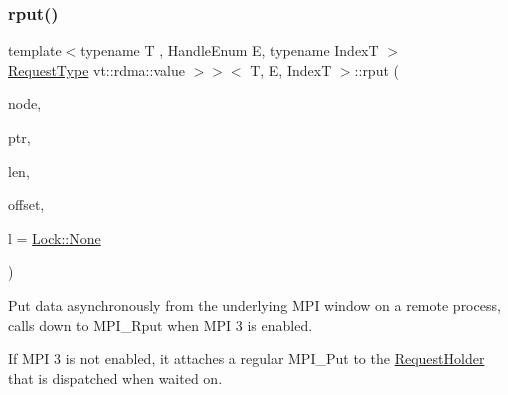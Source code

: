 \subsubsection{\texorpdfstring{rput()}{rput()}}
{\footnotesize\ttfamily template$<$typename T , Handle\+Enum E, typename IndexT $>$ \\
\hyperlink{structvt_1_1rdma_1_1_handle_3_01_t_00_01_e_00_01_index_t_00_01typename_01std_1_1enable__if__t_3_d15dac1b5db6e2bc0fb0b8aca42b1456_a94cb0db8d9b038fb504cb01b1d1d37a9}{Request\+Type} vt\+::rdma\+::value $>$$>$$<$ T, E, IndexT $>$\+::rput (\begin{DoxyParamCaption}\item[{\hyperlink{namespacevt_a866da9d0efc19c0a1ce79e9e492f47e2}{vt\+::\+Node\+Type}}]{node,  }\item[{T $\ast$}]{ptr,  }\item[{std\+::size\+\_\+t}]{len,  }\item[{int}]{offset,  }\item[{\hyperlink{namespacevt_1_1rdma_ac5c20b41a653e520b6305d4d454ecb70}{Lock}}]{l = {\ttfamily \hyperlink{namespacevt_1_1rdma_ac5c20b41a653e520b6305d4d454ecb70a6adf97f83acf6453d4a6a4b1070f3754}{Lock\+::\+None}} }\end{DoxyParamCaption})}



Put data asynchronously from the underlying M\+PI window on a remote process, calls down to {\ttfamily M\+P\+I\+\_\+\+Rput} when M\+PI 3 is enabled. 

If M\+PI 3 is not enabled, it attaches a regular {\ttfamily M\+P\+I\+\_\+\+Put} to the {\ttfamily \hyperlink{structvt_1_1rdma_1_1_request_holder}{Request\+Holder}} that is dispatched when waited on.


